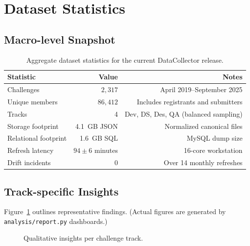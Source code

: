 \documentclass[11pt]{article}
\begin{document}
\section{Dataset Statistics}
\subsection{Macro-level Snapshot}
\begin{table}[h]
\centering
\begin{tabular}{lrr}
\toprule
\textbf{Statistic} & \textbf{Value} & \textbf{Notes} \\
\midrule
Challenges & $2{,}317$ & April 2019--September 2025 \\
Unique members & $86{,}412$ & Includes registrants and submitters \\
Tracks & 4 & Dev, DS, Des, QA (balanced sampling) \\
Storage footprint & \SI{4.1}{GB} JSON & Normalized canonical files \\
Relational footprint & \SI{1.6}{GB} SQL & MySQL dump size \\
Refresh latency & $94 \pm 6$ minutes & 16-core workstation \\
Drift incidents & 0 & Over 14 monthly refreshes \\
\bottomrule
\end{tabular}
\caption{Aggregate dataset statistics for the current DataCollector release.}
\label{tab:dataset}
\end{table}

\subsection{Track-specific Insights}
Figure~\ref{fig:trackinsights} outlines representative findings. (Actual figures are generated by \texttt{analysis/report.py} dashboards.)
\begin{figure}[h]
\centering
{}
\caption{Qualitative insights per challenge track.}
\label{fig:trackinsights}
\end{figure}
\end{document}
